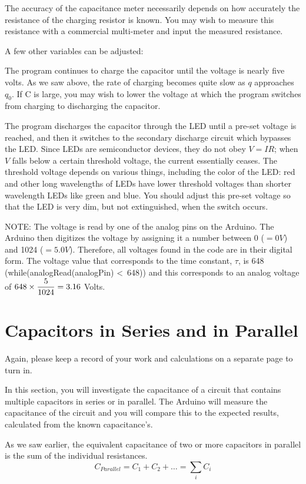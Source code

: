 \documentclass[]{article}
\begin{document}
The accuracy of the capacitance meter necessarily depends on how accurately the resistance of the charging resistor is known.  You may wish to measure this resistance with a commercial multi-meter and input the measured resistance.  

A few other variables can be adjusted:  

The program continues to charge the capacitor until the voltage is nearly five volts.   As we saw above, the rate of charging becomes quite slow as $q$ approaches $q_0$.  If C is large, you may wish to lower the voltage at which the program switches from charging to discharging the capacitor.

The program discharges the capacitor through the LED until a pre-set voltage is reached, and then it switches to the secondary discharge circuit which bypasses the LED.  Since LEDs are semiconductor devices, they do not obey $V=IR$; when $V$ falls below a certain threshold voltage, the current essentially ceases.  The threshold voltage depends on various things, including the color of the LED: red and other long wavelengths of LEDs have lower threshold voltages than shorter wavelength LEDs like green and blue.  You should adjust this pre-set voltage so that the LED is very dim, but not extinguished, when the switch occurs.

NOTE: The voltage is read by one of the analog pins on the Arduino.  The Arduino then digitizes the voltage by assigning it a number between 0 ($=0V$) and 1024 ($=5.0V$).  Therefore, all voltages found in the code are in their digital form.  The voltage value that corresponds to the time constant, $\tau$, is 648 (while(analogRead(analogPin) \textless \ 648)) and this corresponds to an analog voltage of $\displaystyle 648 \times \frac{5}{1024} = 3.16$ Volts.



\section{Capacitors in Series and in Parallel}
Again, please keep a record of your work and  calculations on a separate page to turn in.

In this section, you will investigate the capacitance of a circuit that contains multiple capacitors in series or in parallel.  The Arduino will measure the capacitance of the circuit and you will compare this to the expected results, calculated from the known capacitance's.

As we saw earlier, the equivalent capacitance of two or more capacitors in parallel is the sum of the individual resistances.
\begin{equation*}
C_{Parallel} = C_1 + C_2 +\dots = \sum_i C_i
\end{equation*}
\end{document}
